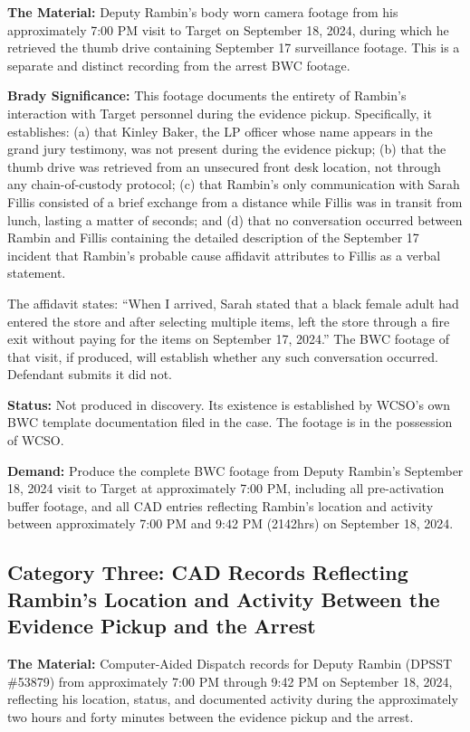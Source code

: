 \documentclass[12pt,letterpaper]{extarticle}
\begin{document}
\textbf{The Material:} Deputy Rambin's body worn camera footage from his
approximately 7:00 PM visit to Target on September 18, 2024, during which he
retrieved the thumb drive containing September 17 surveillance footage. This is a
separate and distinct recording from the arrest BWC footage.

\textbf{Brady Significance:} This footage documents the entirety of Rambin's
interaction with Target personnel during the evidence pickup. Specifically, it
establishes: (a) that Kinley Baker, the LP officer whose name appears in the
grand jury testimony, was not present during the evidence pickup; (b) that the
thumb drive was retrieved from an unsecured front desk location, not through any
chain-of-custody protocol; (c) that Rambin's only communication with Sarah Fillis
consisted of a brief exchange from a distance while Fillis was in transit from
lunch, lasting a matter of seconds; and (d) that no conversation occurred between
Rambin and Fillis containing the detailed description of the September 17 incident
that Rambin's probable cause affidavit attributes to Fillis as a verbal statement.

The affidavit states: ``When I arrived, Sarah stated that a black female adult had
entered the store and after selecting multiple items, left the store through a fire
exit without paying for the items on September 17, 2024.'' The BWC footage of
that visit, if produced, will establish whether any such conversation occurred.
Defendant submits it did not.

\textbf{Status:} Not produced in discovery. Its existence is established by
WCSO's own BWC template documentation filed in the case. The footage is in the
possession of WCSO.

\textbf{Demand:} Produce the complete BWC footage from Deputy Rambin's
September 18, 2024 visit to Target at approximately 7:00 PM, including all
pre-activation buffer footage, and all CAD entries reflecting Rambin's location
and activity between approximately 7:00 PM and 9:42 PM (2142hrs) on September 18,
2024.

\subsection{Category Three: CAD Records Reflecting Rambin's Location and
Activity Between the Evidence Pickup and the Arrest}

\textbf{The Material:} Computer-Aided Dispatch records for Deputy Rambin
(DPSST \#53879) from approximately 7:00 PM through 9:42 PM on September 18, 2024,
reflecting his location, status, and documented activity during the approximately
two hours and forty minutes between the evidence pickup and the arrest.
\end{document}
